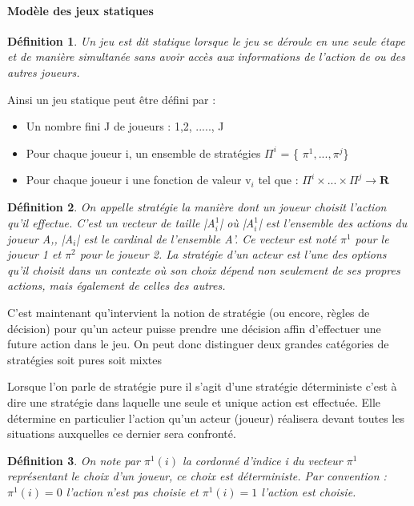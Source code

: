 \documentclass[a4paper, 12pt, twoside]{article}
\newtheorem{definition}{Définition}
\begin{document}
\paragraph{Modèle des jeux statiques}
\begin{definition}
Un jeu est dit statique lorsque le jeu se déroule en une seule étape et de manière simultanée sans avoir accès aux informations de l'action de ou des autres joueurs.
\end{definition} 

Ainsi un \textsf{jeu statique} peut être défini par : 
\begin{itemize}
\item Un nombre fini J de joueurs : {1,2, ....., J}
\item Pour chaque joueur \textsf{i}, un ensemble de stratégies $ \Pi^{i} $ = \{ $ \pi^{1} ,...,\pi^{j} $\}
\item Pour chaque joueur \textsf{i} une fonction de valeur \textsf{v}$_{i}$ tel que : 
$ \Pi^{i} \times ... \times \Pi^{j} \rightarrow \mathbf{R} $
\end{itemize}

\begin{definition}
On appelle stratégie la manière dont un joueur choisit l'action qu'il effectue. C'est un vecteur de taille |A$ _{i} ^{1}$| où |A$ _{i} ^{1}$| est l'ensemble des actions du joueur A,, |A$_{i}$| est le cardinal de l'ensemble A'. Ce vecteur est noté $\pi^{1}$ pour le joueur 1 et $\pi^{2}$ pour le joueur 2. La stratégie d’un acteur est l’une des options qu’il choisit dans un contexte où son choix dépend non seulement de ses propres actions, mais également de celles des autres.
\end{definition}

C'est maintenant qu'intervient la notion de \textsf{stratégie} (ou encore, règles de décision) pour qu'un acteur puisse prendre une décision affin d'effectuer une future action dans le jeu.
On peut donc distinguer deux grandes catégories de \textsf{stratégies} soit pures soit mixtes \newline

Lorsque l'on parle de stratégie pure il s'agit d'une stratégie déterministe c'est à dire une stratégie dans laquelle une seule et unique action est effectuée. Elle détermine en particulier l'action qu'un acteur (joueur) réalisera devant toutes les situations auxquelles ce dernier sera confronté. \newline

\begin{definition}
On note par $ \pi^{1}(i)$ la cordonné d'indice i du vecteur $\pi^{1}$ représentant le choix d'un joueur, ce choix est déterministe. Par convention :   $\pi^{1}(i) = 0$ l'action n'est pas choisie et  $\pi^{1}(i) =1$ l'action est choisie.
\end{definition}
\end{document}
